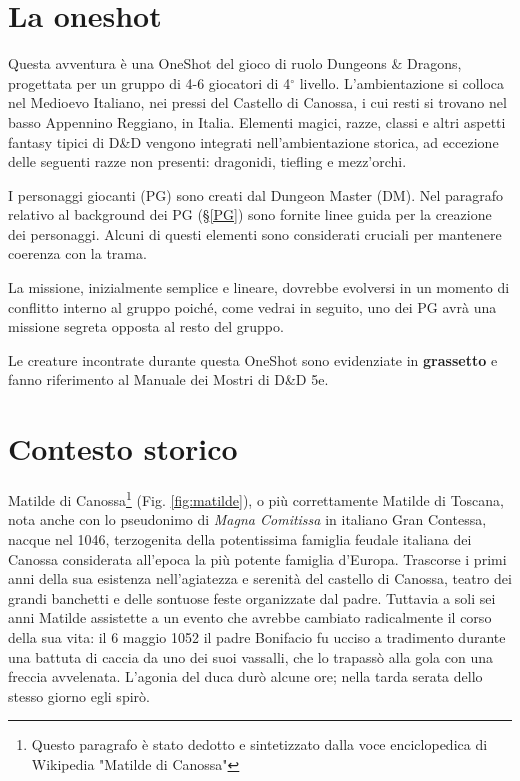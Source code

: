 \documentclass[letterpaper,twocolumn,openany,nodeprecatedcode]{dndbook}
\begin{document}
\section{La oneshot}
Questa avventura è una OneShot del gioco di ruolo Dungeons \& Dragons\cite{dnd:giocatore}, progettata per un gruppo di 4-6 giocatori di 4$^\circ$ livello. L'ambientazione si colloca nel Medioevo Italiano, nei pressi del Castello di Canossa, i cui resti si trovano nel basso Appennino Reggiano, in Italia. Elementi magici, razze, classi e altri aspetti fantasy tipici di D\&D vengono integrati nell'ambientazione storica, ad eccezione delle seguenti razze non presenti: dragonidi, tiefling e mezz'orchi.

I personaggi giocanti (PG) sono creati dal Dungeon Master (DM). Nel paragrafo relativo al background dei PG (§\ref{PG}) sono fornite linee guida per la creazione dei personaggi. Alcuni di questi elementi sono considerati cruciali per mantenere coerenza con la trama.

La missione, inizialmente semplice e lineare, dovrebbe evolversi in un momento di conflitto interno al gruppo poiché, come vedrai in seguito, uno dei PG avrà una missione segreta opposta al resto del gruppo.

Le creature incontrate durante questa OneShot sono evidenziate in \textbf{grassetto} e fanno riferimento al Manuale dei Mostri di D\&D 5e\cite{dnd:mostri}.



\section{Contesto storico}

Matilde di Canossa\footnote{Questo paragrafo è stato dedotto e sintetizzato dalla voce enciclopedica di Wikipedia "Matilde di Canossa"} (Fig. \ref{fig:matilde})\cite{wiki:matilde}, o più correttamente Matilde di Toscana, nota anche con lo pseudonimo di \textit{Magna Comitissa} in italiano Gran Contessa, nacque nel 1046, terzogenita della potentissima famiglia feudale italiana dei Canossa considerata all'epoca la più potente famiglia d'Europa. Trascorse i primi anni della sua esistenza nell'agiatezza e serenità del castello di Canossa, teatro dei grandi banchetti e delle sontuose feste organizzate dal padre. Tuttavia a soli sei anni Matilde assistette a un evento che avrebbe cambiato radicalmente il corso della sua vita: il 6 maggio 1052 il padre Bonifacio fu ucciso a tradimento durante una battuta di caccia da uno dei suoi vassalli, che lo trapassò alla gola con una freccia avvelenata. L'agonia del duca durò alcune ore; nella tarda serata dello stesso giorno egli spirò.
\end{document}
